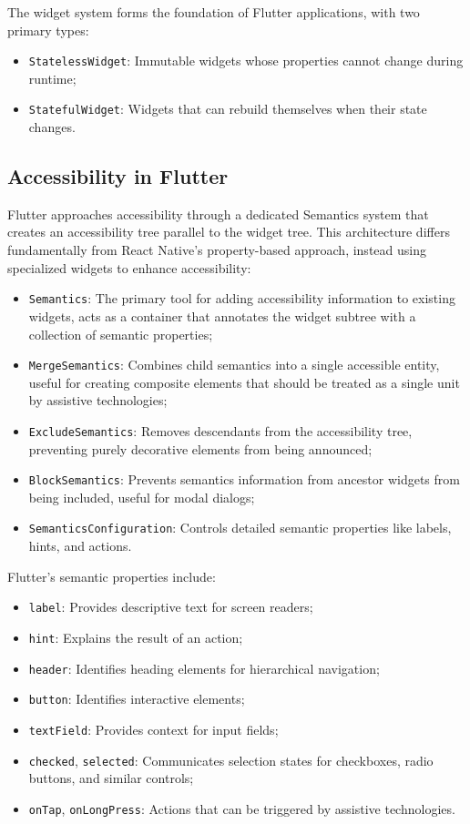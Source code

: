The widget system forms the foundation of Flutter applications, with two primary types:
\begin{itemize}
    \item \texttt{StatelessWidget}: Immutable widgets whose properties cannot change during runtime;
    \item \texttt{StatefulWidget}: Widgets that can rebuild themselves when their state changes.
\end{itemize}

\subsection{Accessibility in Flutter}
Flutter approaches accessibility through a dedicated Semantics system that creates an accessibility tree parallel to the widget tree. This architecture differs fundamentally from React Native's property-based approach, instead using specialized widgets to enhance accessibility:

\begin{itemize}
    \item \texttt{Semantics}: The primary tool for adding accessibility information to existing widgets, acts as a container that annotates the widget subtree with a collection of semantic properties;
    \item \texttt{MergeSemantics}: Combines child semantics into a single accessible entity, useful for creating composite elements that should be treated as a single unit by assistive technologies;
    \item \texttt{ExcludeSemantics}: Removes descendants from the accessibility tree, preventing purely decorative elements from being announced;
    \item \texttt{BlockSemantics}: Prevents semantics information from ancestor widgets from being included, useful for modal dialogs;
    \item \texttt{SemanticsConfiguration}: Controls detailed semantic properties like labels, hints, and actions.
\end{itemize}

Flutter's semantic properties include:
\begin{itemize}
    \item \texttt{label}: Provides descriptive text for screen readers;
    \item \texttt{hint}: Explains the result of an action;
    \item \texttt{header}: Identifies heading elements for hierarchical navigation;
    \item \texttt{button}: Identifies interactive elements;
    \item \texttt{textField}: Provides context for input fields;
    \item \texttt{checked}, \texttt{selected}: Communicates selection states for checkboxes, radio buttons, and similar controls;
    \item \texttt{onTap}, \texttt{onLongPress}: Actions that can be triggered by assistive technologies.
\end{itemize}

